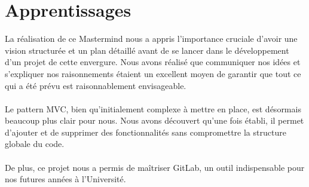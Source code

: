 
\section{Apprentissages}

La réalisation de ce Mastermind nous a appris l'importance cruciale d'avoir une vision structurée et un plan détaillé avant de se lancer dans le développement d'un projet de cette envergure. Nous avons réalisé que communiquer nos idées et s'expliquer nos raisonnements étaient un excellent moyen de garantir que tout ce qui a été prévu est raisonnablement envisageable.
\\\\
Le pattern MVC, bien qu'initialement complexe à mettre en place, est désormais beaucoup plus clair pour nous. Nous avons découvert qu'une fois établi, il permet d'ajouter et de supprimer des fonctionnalités sans compromettre la structure globale du code. 
\\\\
De plus, ce projet nous a permis de maîtriser GitLab, un outil indispensable pour nos futures années à l'Université.
